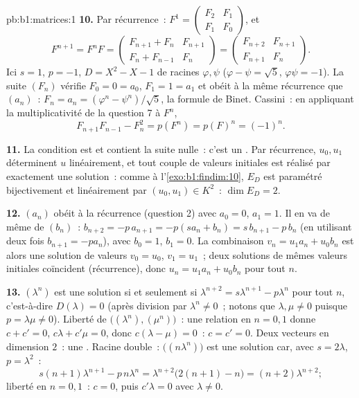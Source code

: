 \begin{solution}{pb:b1:matrices:1}
\textbf{10.} Par récurrence~: $F^1 = \begin{pmatrix} F_2 & F_1\\ F_1 &
F_0\end{pmatrix}$, et
\[
F^{n+1} = F^n F =
\begin{pmatrix} F_{n+1} + F_n & F_{n+1}\\
F_n + F_{n-1} & F_n \end{pmatrix}
= \begin{pmatrix} F_{n+2} & F_{n+1}\\ F_{n+1} & F_n
\end{pmatrix}.
\]
Ici $s = 1$, $p = -1$, $D = X^2 - X - 1$ de racines $\varphi,
\psi$ ($\varphi - \psi = \sqrt5$, $\varphi\psi = -1$). La
suite $(F_n)$ vérifie $F_0 = 0 = a_0$, $F_1 = 1 = a_1$ et obéit
à la même récurrence que $(a_n)$~: $F_n = a_n = (\varphi^n -
\psi^n)/\sqrt5$, la formule de Binet. Cassini~: en appliquant la
multiplicativité de la question 7 à $F^n$,
\[
F_{n+1}F_{n-1} - F_n^2 = p(F^n) = p(F)^n = (-1)^n .
\]

\textbf{11.} La condition est  et contient la suite nulle~:
c'est un . Par récurrence, $u_0, u_1$ déterminent
$u$ linéairement, et tout couple de valeurs initiales est réalisé par
exactement une solution~: comme à l'\cref{exo:b1:findim:10}, $E_D$ est
paramétré bijectivement et linéairement par $(u_0, u_1) \in K^2$~:
$\dim E_D = 2$.

\textbf{12.} $(a_n)$ obéit à la récurrence (question 2) avec $a_0
= 0$, $a_1 = 1$. Il en va de même de $(b_n)$~: $b_{n+2} = -p\,a_{n+1} =
-p(s a_n + b_n) = s\,b_{n+1} - p\,b_n$ (en utilisant deux fois
$b_{n+1} = -pa_n$), avec $b_0 = 1$, $b_1 = 0$. La combinaison $v_n =
u_1 a_n + u_0 b_n$ est alors une solution de valeurs $v_0 = u_0$, $v_1 =
u_1$~; deux solutions de mêmes valeurs initiales coïncident
(récurrence), donc $u_n = u_1 a_n + u_0 b_n$ pour tout $n$.

\textbf{13.} $(\lambda^n)$ est une solution si et seulement si
$\lambda^{n+2} = s\lambda^{n+1} - p\lambda^n$ pour tout $n$,
c'est-à-dire $D(\lambda) = 0$
(après division par $\lambda^n \neq 0$~; notons que $\lambda, \mu \neq
0$ puisque $p = \lambda\mu \neq 0$). Liberté de
$\bigl((\lambda^n), (\mu^n)\bigr)$~: une relation en $n = 0, 1$
donne $c + c' = 0$, $c\lambda + c'\mu = 0$, donc $c(\lambda - \mu)
= 0$~: $c = c' = 0$. Deux vecteurs  en dimension $2$~: une .
Racine double~: $\bigl((n\lambda^n)\bigr)$ est une solution car,
avec $s = 2\lambda$, $p = \lambda^2$~:
\[
s(n+1)\lambda^{n+1} - p\,n\lambda^n
= \lambda^{n+2}\bigl(2(n+1) - n\bigr) = (n+2)\lambda^{n+2} ;
\]
liberté en $n = 0, 1$~: $c = 0$, puis $c'\lambda = 0$ avec
$\lambda \neq 0$.


\end{solution}
